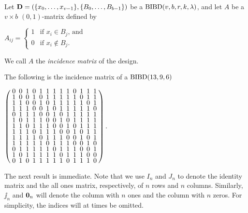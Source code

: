 \documentclass[../../../main]{subfiles}
\begin{document}
\begin{defin}\label{incidence}
 Let $\mathbf{D}=(\{x_0, \dots, x_{v-1}\},\{B_0, \dots, B_{b-1}\})$ be a $\text{BIBD}(v,b,r,k,\lambda)$, and let $A$ be a $v \times b$ $(0,1)$-matrix defined by
 \begin{defenum}
 \item $A_{ij} = 
 \begin{cases}
  1 & \text{if } x_i \in B_j \text{, and} \\
  0 & \text{if } x_i \not\in B_j.
 \end{cases}$
 \end{defenum}
 We call $A$ the {\it incidence matrix} of the design.
\end{defin}

\begin{ex}
  The following is the incidence matrix of a $\text{BIBD}(13,9,6)$
  \begin{defenum}
    \item\label{ex-symmetric-bibd}
   $ 
      \left(
        \arraycolsep=2.5pt\def\arraystretch{0.625}
        \begin{array}{ccccccccccccc}
          0&0&1&0&1&1&1&1&1&0&1&1&1\\
          1&0&0&1&0&1&1&1&1&1&0&1&1\\
          1&1&0&0&1&0&1&1&1&1&1&0&1\\
          1&1&1&0&0&1&0&1&1&1&1&1&0\\
          0&1&1&1&0&0&1&0&1&1&1&1&1\\
          1&0&1&1&1&0&0&1&0&1&1&1&1\\
          1&1&0&1&1&1&0&0&1&0&1&1&1\\
          1&1&1&0&1&1&1&0&0&1&0&1&1\\
          1&1&1&1&0&1&1&1&0&0&1&0&1\\
          1&1&1&1&1&0&1&1&1&0&0&1&0\\
          0&1&1&1&1&1&0&1&1&1&0&0&1\\
          1&0&1&1&1&1&1&0&1&1&1&0&0\\
          0&1&0&1&1&1&1&1&0&1&1&1&0\\
        \end{array}
      \right).
    $
    \end{defenum}
\end{ex}

The next result is immediate. Note that we use $I_n$ and $J_n$ to denote the identity matrix and the all ones matrix, respectively, of $n$ rows and $n$ columns. Similarly, $\jj_n$ and $\mathbf{0}_n$ will denote the column with $n$ ones and the column with $n$ zeros. For simplicity, the indices will at times be omitted.
\end{document}
